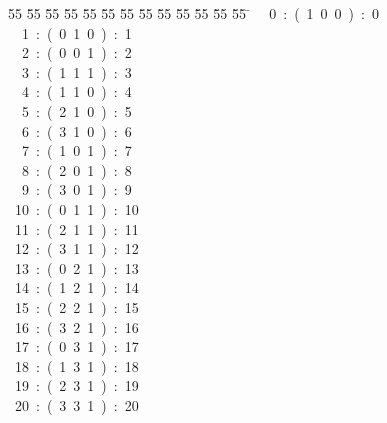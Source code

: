 %
%
\begin{tabbing}
55 \= 55 \= 55 \= 55 \= 55 \= 55 \= 55 \= 55 \= 55 \= 55 \= 55 \= 55 \= 55 \= \kill
\ \ 0\ :\ (\ 1\ 0\ 0\ )\ :\ 0\\[0pt]
\ \ 1\ :\ (\ 0\ 1\ 0\ )\ :\ 1\\[0pt]
\ \ 2\ :\ (\ 0\ 0\ 1\ )\ :\ 2\\[0pt]
\ \ 3\ :\ (\ 1\ 1\ 1\ )\ :\ 3\\[0pt]
\ \ 4\ :\ (\ 1\ 1\ 0\ )\ :\ 4\\[0pt]
\ \ 5\ :\ (\ 2\ 1\ 0\ )\ :\ 5\\[0pt]
\ \ 6\ :\ (\ 3\ 1\ 0\ )\ :\ 6\\[0pt]
\ \ 7\ :\ (\ 1\ 0\ 1\ )\ :\ 7\\[0pt]
\ \ 8\ :\ (\ 2\ 0\ 1\ )\ :\ 8\\[0pt]
\ \ 9\ :\ (\ 3\ 0\ 1\ )\ :\ 9\\[0pt]
\ 10\ :\ (\ 0\ 1\ 1\ )\ :\ 10\\[0pt]
\ 11\ :\ (\ 2\ 1\ 1\ )\ :\ 11\\[0pt]
\ 12\ :\ (\ 3\ 1\ 1\ )\ :\ 12\\[0pt]
\ 13\ :\ (\ 0\ 2\ 1\ )\ :\ 13\\[0pt]
\ 14\ :\ (\ 1\ 2\ 1\ )\ :\ 14\\[0pt]
\ 15\ :\ (\ 2\ 2\ 1\ )\ :\ 15\\[0pt]
\ 16\ :\ (\ 3\ 2\ 1\ )\ :\ 16\\[0pt]
\ 17\ :\ (\ 0\ 3\ 1\ )\ :\ 17\\[0pt]
\ 18\ :\ (\ 1\ 3\ 1\ )\ :\ 18\\[0pt]
\ 19\ :\ (\ 2\ 3\ 1\ )\ :\ 19\\[0pt]
\ 20\ :\ (\ 3\ 3\ 1\ )\ :\ 20\\[0pt]
\end{tabbing}

